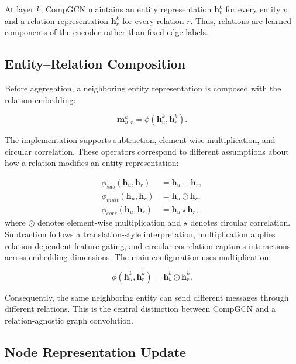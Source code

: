 At layer $k$, CompGCN maintains an entity representation
$\mathbf{h}_{v}^{k}$ for every entity $v$ and a relation representation
$\mathbf{h}_{r}^{k}$ for every relation $r$. Thus, relations are learned
components of the encoder rather than fixed edge labels.

\subsection{Entity--Relation Composition}

Before aggregation, a neighboring entity representation is composed with the
relation embedding:

\begin{equation}
    \mathbf{m}_{u,r}^{k}
    =
    \phi
    \left(
        \mathbf{h}_{u}^{k},
        \mathbf{h}_{r}^{k}
    \right).
\end{equation}

The implementation supports subtraction, element-wise multiplication, and
circular correlation. These operators correspond to different assumptions
about how a relation modifies an entity representation:

\begin{align}
    \phi_{sub}(\mathbf{h}_{u},\mathbf{h}_{r})
    &=
    \mathbf{h}_{u}-\mathbf{h}_{r}, \\
    \phi_{mult}(\mathbf{h}_{u},\mathbf{h}_{r})
    &=
    \mathbf{h}_{u}\odot\mathbf{h}_{r}, \\
    \phi_{corr}(\mathbf{h}_{u},\mathbf{h}_{r})
    &=
    \mathbf{h}_{u}\star\mathbf{h}_{r},
\end{align}
where $\odot$ denotes element-wise multiplication and $\star$ denotes circular
correlation. Subtraction follows a translation-style interpretation,
multiplication applies relation-dependent feature gating, and circular
correlation captures interactions across embedding dimensions. The main
configuration uses multiplication:

\begin{equation}
    \phi
    \left(
        \mathbf{h}_{u}^{k},
        \mathbf{h}_{r}^{k}
    \right)
    =
    \mathbf{h}_{u}^{k}\odot\mathbf{h}_{r}^{k}.
\end{equation}

Consequently, the same neighboring entity can send different messages through
different relations. This is the central distinction between CompGCN and a
relation-agnostic graph convolution.

\subsection{Node Representation Update}

